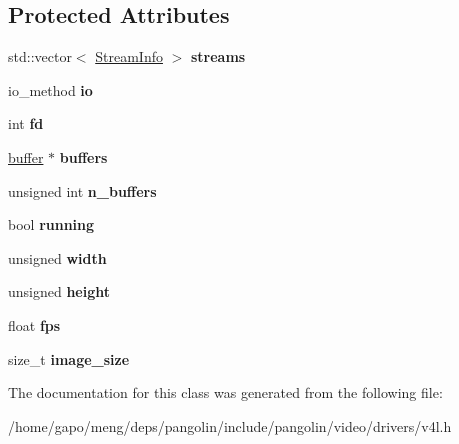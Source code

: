 \subsection*{Protected Attributes}
\begin{DoxyCompactItemize}
\item 
std\+::vector$<$ \hyperlink{classpangolin_1_1_stream_info}{Stream\+Info} $>$ {\bfseries streams}\hypertarget{classpangolin_1_1_v4l_video_a9771b87a27ad851fa81ea13768eda966}{}\label{classpangolin_1_1_v4l_video_a9771b87a27ad851fa81ea13768eda966}

\item 
io\+\_\+method {\bfseries io}\hypertarget{classpangolin_1_1_v4l_video_aafa59444a2b911df8683f842c1feaba8}{}\label{classpangolin_1_1_v4l_video_aafa59444a2b911df8683f842c1feaba8}

\item 
int {\bfseries fd}\hypertarget{classpangolin_1_1_v4l_video_a3bb336b39aadbaade92198a8f7a5b1ce}{}\label{classpangolin_1_1_v4l_video_a3bb336b39aadbaade92198a8f7a5b1ce}

\item 
\hyperlink{structpangolin_1_1buffer}{buffer} $\ast$ {\bfseries buffers}\hypertarget{classpangolin_1_1_v4l_video_ac0a8f37b6d928847a2c968627eec7b7c}{}\label{classpangolin_1_1_v4l_video_ac0a8f37b6d928847a2c968627eec7b7c}

\item 
unsigned int {\bfseries n\+\_\+buffers}\hypertarget{classpangolin_1_1_v4l_video_a3d9daca852997941b524c3856fb30b5a}{}\label{classpangolin_1_1_v4l_video_a3d9daca852997941b524c3856fb30b5a}

\item 
bool {\bfseries running}\hypertarget{classpangolin_1_1_v4l_video_a9e873d28ed7d80dc3648b53137f77e9c}{}\label{classpangolin_1_1_v4l_video_a9e873d28ed7d80dc3648b53137f77e9c}

\item 
unsigned {\bfseries width}\hypertarget{classpangolin_1_1_v4l_video_af880ba8871b91b0b020c06273c5b652f}{}\label{classpangolin_1_1_v4l_video_af880ba8871b91b0b020c06273c5b652f}

\item 
unsigned {\bfseries height}\hypertarget{classpangolin_1_1_v4l_video_a57945faa1eb9b8f63a93e2fccb149676}{}\label{classpangolin_1_1_v4l_video_a57945faa1eb9b8f63a93e2fccb149676}

\item 
float {\bfseries fps}\hypertarget{classpangolin_1_1_v4l_video_a97797118cb7532f10008ca36eab1a56a}{}\label{classpangolin_1_1_v4l_video_a97797118cb7532f10008ca36eab1a56a}

\item 
size\+\_\+t {\bfseries image\+\_\+size}\hypertarget{classpangolin_1_1_v4l_video_abfca1d79f922b7f66935c857a61143aa}{}\label{classpangolin_1_1_v4l_video_abfca1d79f922b7f66935c857a61143aa}

\end{DoxyCompactItemize}


The documentation for this class was generated from the following file\+:\begin{DoxyCompactItemize}
\item 
/home/gapo/meng/deps/pangolin/include/pangolin/video/drivers/v4l.\+h\end{DoxyCompactItemize}
